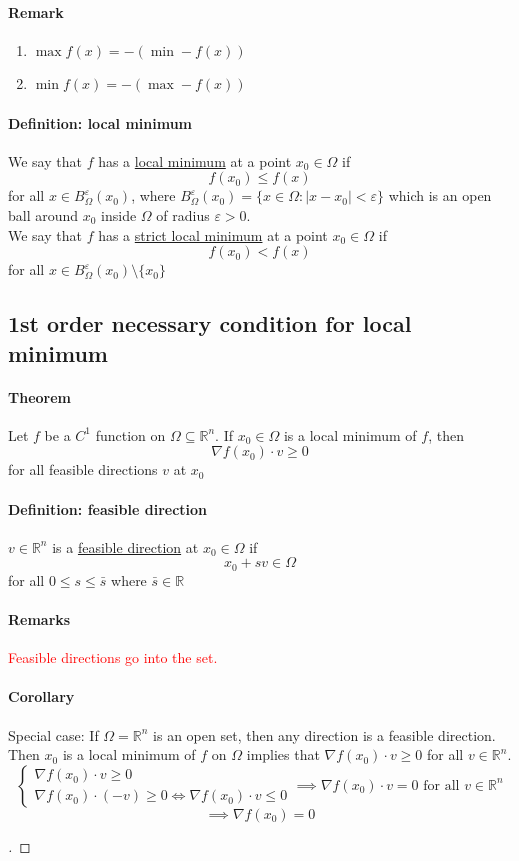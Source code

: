 \documentclass[11pt]{article}
\newcommand{\real}[0]{\mathbb{R}}
\newcommand{\under}[1]{\underline{#1}}
\begin{document}
\paragraph{Remark}
\begin{enumerate}
	\item $\max f(x) = - (\min - f(x))$
	\item $\min f(x) = - (\max - f(x))$
\end{enumerate}

\paragraph{Definition: local minimum}
We say that $f$ has a \under{local minimum} at a point $x_0 \in \Omega$ if
$$f(x_0) \leq f(x)$$ for all $x \in B_{\Omega}^\varepsilon (x_0)$, where $B_{\Omega}^\varepsilon (x_0) = \{ x \in \Omega: |x - x_0| < \varepsilon\}$ which is an open ball around $x_0$ inside $\Omega$ of radius $\varepsilon >0$. \\
We say that $f$ has a \under{strict local minimum} at a point $x_0 \in \Omega$ if
$$f(x_0) < f(x)$$ for all $x \in B_{\Omega}^\varepsilon (x_0) \setminus \{x_0\}$

\subsection{1st order necessary condition for local minimum}
\paragraph{Theorem} Let $f$ be a $C^1$ function on $\Omega \subseteq \real^n$. If $x_0 \in \Omega$ is a local minimum of $f$, then
$$ \nabla f(x_0) \cdot v \geq 0$$
for all feasible directions $v$ at $x_0$

\paragraph{Definition: feasible direction}
$v \in \real^n$ is a \under{feasible direction} at $x_0 \in \Omega$ if $$x_0 + sv \in \Omega$$ for all $0 \leq s \leq \bar{s}$ where $\bar{s} \in \real$
\paragraph{Remarks}
\textcolor{red}{Feasible directions go into the set.}
\paragraph{Corollary}
Special case: If $\Omega = \real^n$ is an open set, then any direction is a feasible direction.
Then $x_0$ is a local minimum of $f$ on $\Omega$ implies that $\nabla f(x_0) \cdot v \geq 0$ for all $v \in \real^n$.
$$\begin{cases}
	\nabla f(x_0) \cdot v \geq 0 \\
	\nabla f(x_0) \cdot (-v) \geq 0 \iff \nabla f(x_0) \cdot v \leq 0
\end{cases} \implies \nabla f(x_0) \cdot v = 0 \text{ for all $v \in \real^n$}$$
$$\implies \nabla f(x_0) = 0$$
\begin{proof}
[ ]
\end{proof}
\end{document}
